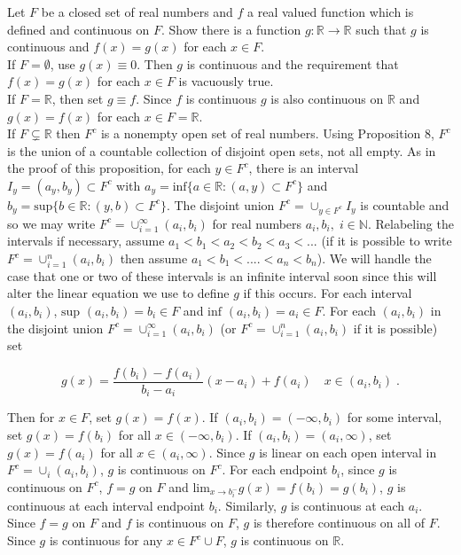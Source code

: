 \documentclass[a4paper]{article}
\begin{document}
Let $F$ be a closed set of real numbers and $f$ a real valued function which is defined and continuous on $F$. Show there is a function $g : \mathbb{R}\rightarrow \mathbb{R}$ such that $g$ is continuous and $f(x) = g(x)$ for each $x \in F$. \\

If $F = \emptyset$, use $g(x) \equiv 0$. Then $g$ is continuous and the requirement that $f(x) = g(x)$ for each $x \in F$ is vacuously true.\\

If $F = \mathbb{R}$, then set $g \equiv f$. Since $f$ is continuous $g$ is also continuous on $\mathbb{R}$ and $g(x) = f(x)$ for each $x \in F = \mathbb{R}$. \\

If $F \subsetneq \mathbb{R}$ then $F^c$ is a nonempty open set of real numbers. Using Proposition 8, $F^c$ is the union of a countable collection of disjoint open sets, not all empty. As in the proof of this proposition, for each $y \in F^c$, there is an interval $I_y = (a_y,b_y) \subset F^c$ with $a_y = \text{inf}\{a \in \mathbb{R}: (a,y) \subset F^c\}$ and $b_y = \text{sup}\{b \in \mathbb{R}: (y,b) \subset F^c\}$. The disjoint union  $F^c = \cup_{y \in F^c}I_y$ is countable and so we may write $F^c = \cup_{i=1}^{\infty} (a_i,b_i)$ for real numbers $a_i,b_i, \;i \in \mathbb{N}$. Relabeling the intervals if necessary, assume $a_1<b_1<a_2<b_2<a_3<...$ (if it is possible to write $F^c = \cup_{i=1}^{n} (a_i,b_i)$ then assume $a_1<b_1<....<a_n<b_n$). We will handle the case that one or two of these intervals is an infinite interval soon since this will alter the linear equation we use to define $g$ if this occurs. For each interval $(a_i,b_i)$, $\text{sup }(a_i,b_i) = b_i \in F$ and $\text{inf }(a_i,b_i) = a_i \in F$. For each $(a_i,b_i)$ in the disjoint union $F^c = \cup_{i=1}^{\infty} (a_i,b_i)$ (or $F^c = \cup_{i=1}^{n} (a_i,b_i)$ if it is possible) set 

$$g(x) = \frac{f(b_i) - f(a_i)}{b_i-a_i}(x-a_i) + f(a_i) \quad x \in (a_i,b_i) \;.$$

Then for $x \in F$, set $g(x) = f(x)$. If $(a_i, b_i) = (-\infty, b_i)$ for some interval, set $g(x) = f(b_i)$ for all $x \in (-\infty, b_i)$. If $(a_i,b_i) = (a_i,\infty)$, set $g(x) = f(a_i)$ for all $x \in (a_i,\infty)$. Since $g$ is linear on each open interval in $F^c = \cup_i (a_i,b_i)$, $g$ is continuous on $F^c$. For each endpoint $b_i$, since $g$ is continuous on $F^c$, $f=g$ on $F$ and $\text{lim}_{x\rightarrow b_i^-} g(x) = f(b_i) = g(b_i)$, $g$ is continuous at each interval endpoint $b_i$. Similarly, $g$ is continuous at each $a_i$. Since $f=g$ on $F$ and $f$ is continuous on $F$, $g$ is therefore continuous on all of $F$. Since $g$ is continuous for any $x \in F^c\cup F$, $g$ is continuous on $\mathbb{R}$.  \\
\end{document}

